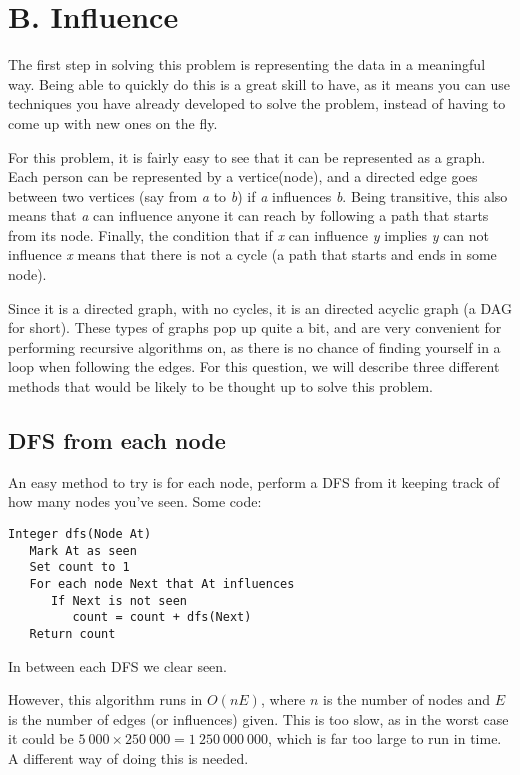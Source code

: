 \section*{B. Influence}

The first step in solving this problem is representing the data in a meaningful way. Being able to quickly do this is a great skill to have, as it means you can use techniques you have already developed to solve the problem, instead of having to come up with new ones on the fly.

For this problem, it is fairly easy to see that it can be represented as a graph. Each person can be represented by a vertice(node), and a directed edge goes between two vertices (say from \emph{a} to \emph{b}) if \emph{a} influences \emph{b}. Being transitive, this also means that \emph{a} can influence anyone it can reach by following a path that starts from its node. Finally, the condition that if \emph{x} can influence \emph{y} implies \emph{y} can not influence \emph{x} means that there is not a cycle (a path that starts and ends in some node).

Since it is a directed graph, with no cycles, it is an directed acyclic graph (a DAG for short). These types of graphs pop up quite a bit, and are very convenient for performing recursive algorithms on, as there is no chance of finding yourself in a loop when following the edges. For this question, we will describe three different methods that would be likely to be thought up to solve this problem.

\subsection*{DFS from each node}

An easy method to try is for each node, perform a DFS from it keeping track of how many nodes you've seen. Some code:

\begin{verbatim}
Integer dfs(Node At)
   Mark At as seen
   Set count to 1
   For each node Next that At influences
      If Next is not seen
         count = count + dfs(Next)
   Return count
\end{verbatim}

In between each DFS we clear seen.

However, this algorithm runs in $O(nE)$, where $n$ is the number of nodes and $E$ is the number of edges (or influences) given. This is too slow, as in the worst case it could be $5\ 000 \times 250\ 000 = 1\ 250\ 000\ 000$, which is far too large to run in time. A different way of doing this is needed.
\newpage
